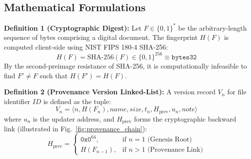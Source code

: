 \documentclass[10pt,conference,letterpaper]{IEEEtran}
\begin{document}
\subsection{Mathematical Formulations}

\textbf{Definition 1 (Cryptographic Digest):} Let $F \in \{0, 1\}^*$ be the arbitrary-length sequence of bytes comprising a digital document. The fingerprint $H(F)$ is computed client-side using NIST FIPS 180-4 SHA-256:
\begin{equation}
H(F) = \text{SHA-256}(F) \in \{0, 1\}^{256} \equiv \mathtt{bytes32}
\end{equation}
By the second-preimage resistance of SHA-256, it is computationally infeasible to find $F' \neq F$ such that $H(F') = H(F)$.

\textbf{Definition 2 (Provenance Version Linked-List):} A version record $V_n$ for file identifier $\mathit{ID}$ is defined as the tuple:
\begin{equation}
V_n = \langle n, H(F_n), \mathit{name}, \mathit{size}, t_n, H_{\mathrm{prev}}, u_n, \mathit{note} \rangle
\end{equation}
where $u_n$ is the updater address, and $H_{\mathrm{prev}}$ forms the cryptographic backward link (illustrated in Fig.~\ref{fig:provenance_chain}):
\begin{equation}
H_{\mathrm{prev}} = 
\begin{cases}
\mathtt{0x0}^{64}, & \text{if } n = 1 \text{ (Genesis Root)} \\
H(F_{n-1}), & \text{if } n > 1 \text{ (Provenance Link)}
\end{cases}
\end{equation}
\end{document}
